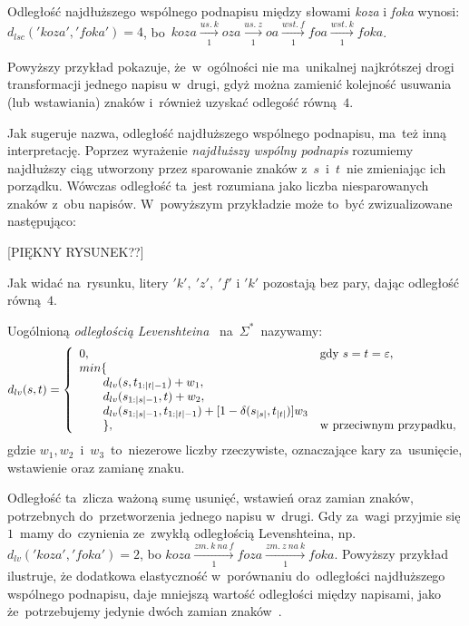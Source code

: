 \documentclass{praca1}
\begin{document}
\begin{example}
Odległość najdłuższego wspólnego podnapisu między słowami \emph{koza} i \emph{foka} wynosi: $d_{lsc}('koza', 'foka') = 4$, bo~$koza  \xrightarrow[1]{us.\ k} oza \xrightarrow[1]{us.\ z} oa  \xrightarrow[1]{wst.\ f} foa \xrightarrow[1]{wst.\ k} foka$.
\end{example}

Powyższy przykład pokazuje, że~w~ogólności nie ma~unikalnej najkrótszej drogi transformacji jednego napisu w~drugi, gdyż można zamienić kolejność usuwania (lub wstawiania) znaków i~również uzyskać odlegość równą~$4$.

Jak sugeruje nazwa, odległość najdłuższego wspólnego podnapisu, ma~też inną interpretację. Poprzez wyrażenie \emph{najdłuższy wspólny podnapis} rozumiemy najdłuższy ciąg utworzony przez sparowanie znaków z~$s$~i~$t$~nie zmieniając ich porządku. Wówczas odległość ta~jest rozumiana jako liczba niesparowanych znaków z~obu napisów. W~powyższym przykładzie może to~być zwizualizowane następująco:
	
[PIĘKNY RYSUNEK??]

Jak widać na~rysunku, litery $'k',\ 'z',\ 'f'$ i $'k'$ pozostają bez pary, dając odległość równą~$4$.

\begin{definition}
Uogólnioną \emph{odległością Levenshteina} \cite{Levenshtein1965:binarycodes}~na~$\Sigma^*$~nazywamy:
$$
d_{lv}(s, t) = \left\{
\begin{array}{l l}     
    0, & \text{gdy } s = t = \varepsilon,\\
    min\{ & \\
\qquad    d_{lv}(s, t_{1:|t|-1}) + w_1, & \\
\qquad    d_{lv}(s_{1:|s|-1}, t) + w_2, & \\
\qquad    d_{lv}(s_{1:|s|-1}, t_{1:|t|-1}) + [1-\delta(s_{|s|}, t_{|t|})]w_3 & \\
\qquad    \}, & \text{w przeciwnym przypadku},
\end{array}\right.
$$
gdzie $w_1, w_2$~i~$w_3$~to~niezerowe liczby rzeczywiste, oznaczające kary za~usunięcie, wstawienie oraz zamianę znaku.
\end{definition}

Odległość ta~zlicza ważoną sumę usunięć, wstawień oraz zamian znaków, potrzebnych do~przetworzenia jednego napisu w~drugi. Gdy za~wagi przyjmie się $1$~mamy do~czynienia ze~zwykłą odległością Levenshteina, np.~$d_{lv}('koza', 'foka') = 2$, bo $koza  \xrightarrow[1]{zm.\ k\ na\ f} foza  \xrightarrow[1]{zm.\ z\ na\ k} foka$. Powyższy przykład ilustruje, że dodatkowa elastyczność w~porównaniu do~odległości najdłuższego wspólnego podnapisu, daje mniejszą wartość odległości między napisami, jako że~potrzebujemy jedynie dwóch zamian znaków~\cite{Loo2014:stringdist}.
\end{document}
